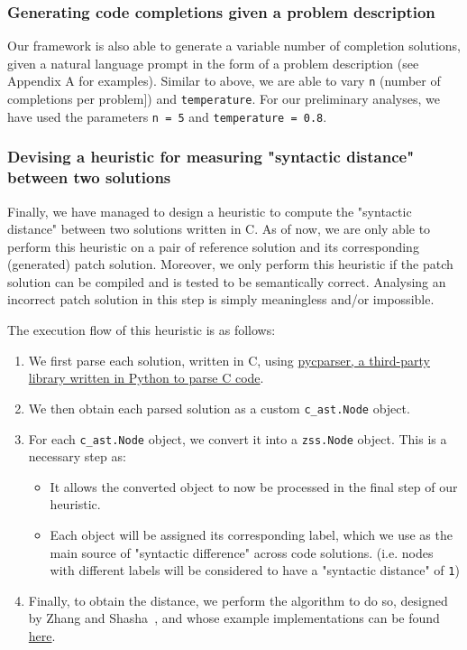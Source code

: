\begin{table}[h]
\centering

\label{table:pass-rate-example}
\end{table}

\subsubsection{Generating code completions given a problem description}

Our framework is also able to generate a variable number of completion solutions, given a natural
language prompt in the form of a problem description (see Appendix A for examples).
Similar to above, we are able to vary \texttt{n} (number of completions per problem]) and
\texttt{temperature}.
For our preliminary analyses, we have used the parameters \texttt{n = 5} and
\texttt{temperature = 0.8}.

\subsubsection{Devising a heuristic for measuring "syntactic distance" between two solutions}

Finally, we have managed to design a heuristic to compute the "syntactic distance" between two solutions
written in C.
As of now, we are only able to perform this heuristic on a pair of reference solution and its corresponding
(generated) patch solution.
Moreover, we only perform this heuristic if the patch solution can be compiled and is tested to be
semantically correct.
Analysing an incorrect patch solution in this step is simply meaningless and/or impossible.

The execution flow of this heuristic is as follows:
\begin{enumerate}
    \item We first parse each solution, written in C, using
          \href{https://github.com/eliben/pycparser}{pycparser, a third-party library written in Python
                to parse C code}.
    \item We then obtain each parsed solution as a custom \texttt{c\_ast.Node} object.
    \item For each \texttt{c\_ast.Node} object, we convert it into a \texttt{zss.Node} object.
          This is a necessary step as:
    \begin{itemize}
        \item It allows the converted object to now be processed in the final step of our heuristic.
        \item Each object will be assigned its corresponding label, which we use as the main source
              of "syntactic difference" across code solutions. (i.e. nodes with different labels
              will be considered to have a "syntactic distance" of \texttt{1})
    \end{itemize}
    \item Finally, to obtain the distance, we perform the algorithm to do so, designed by
          Zhang and Shasha~\cite{zhang1989simple}, and whose example implementations can be found
          \href{https://pythonhosted.org/zss/#module-zss}{here}.
\end{enumerate}